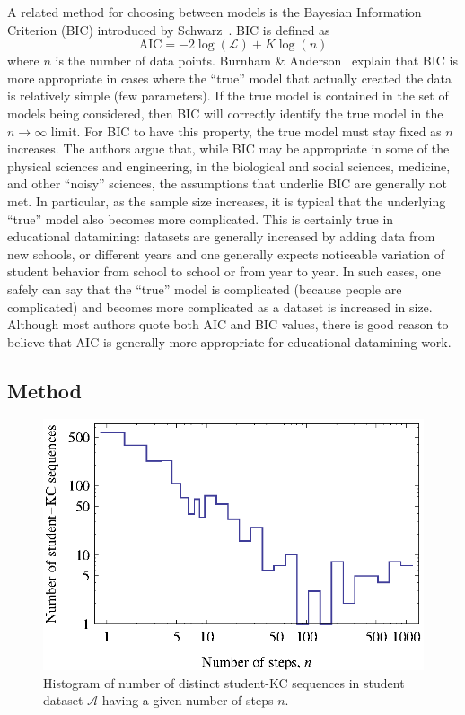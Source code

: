 \documentclass{edm_template}
\begin{document}
A related method for choosing between models is the Bayesian
Information Criterion (BIC) introduced by
Schwarz~\citeyear{schwarz_estimating_1978}.  BIC is defined as
%
\begin{equation}
   \mathrm{AIC}= -2 \log\left(\mathcal{L}\right) + K \log\left(n\right)
\end{equation}
% 
where $n$ is the number of data points.
Burnham \& Anderson~\citeyear[Sections~6.3 \& 6.4]{burnham_model_2002} explain
that BIC is more appropriate in cases where the ``true'' model that
actually created the data is relatively simple (few parameters).  If
the true model is contained in the set of models being considered,
then BIC will correctly identify the true model in the $n\to\infty$
limit.  For BIC to have this property, the true model must stay fixed as 
$n$ increases.  
The authors argue that, while BIC may be appropriate in some
of the physical sciences and engineering, in the biological and social
sciences, medicine, and other ``noisy'' sciences, the assumptions that
underlie BIC are generally not met.  In particular, as the sample size
increases, it is typical that the underlying ``true'' model also
becomes more complicated.  This is certainly true in educational
datamining: datasets are generally increased by adding data from new schools, or
different years and one generally expects noticeable variation of student
behavior from school to school or from year to year.  In such cases, one
safely can say that the ``true'' model is complicated (because people are
complicated) and becomes more complicated as a dataset is increased in
size.  Although most authors quote both AIC and BIC values, there
is good reason to believe that AIC is generally more appropriate for
educational datamining work.

\subsection{Method}

\begin{figure}
  \centering \includegraphics{student-kc-length-histogram.eps}
  \caption{Histogram of number of distinct student-KC sequences in student 
    dataset $\mathcal{A}$ having a given number of steps $n$.}
    \label{student-length-histogram}
\end{figure}
\end{document}
